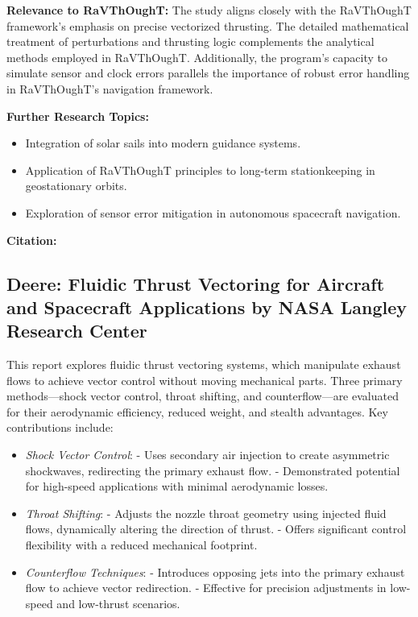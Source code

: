 \textbf{Relevance to RaVThOughT:} The study aligns closely with the RaVThOughT framework's emphasis on precise vectorized thrusting. The detailed mathematical treatment of perturbations and thrusting logic complements the analytical methods employed in RaVThOughT. Additionally, the program’s capacity to simulate sensor and clock errors parallels the importance of robust error handling in RaVThOughT's navigation framework.

\textbf{Further Research Topics:}
\begin{itemize}
    \item Integration of solar sails into modern guidance systems.
    \item Application of RaVThOughT principles to long-term stationkeeping in geostationary orbits.
    \item Exploration of sensor error mitigation in autonomous spacecraft navigation.
\end{itemize}

\textbf{Citation:} 

\subsection{Deere: Fluidic Thrust Vectoring for Aircraft and Spacecraft Applications by NASA Langley Research Center}

This report explores fluidic thrust vectoring systems, which manipulate exhaust flows to achieve vector control without moving mechanical parts. Three primary methods—shock vector control, throat shifting, and counterflow—are evaluated for their aerodynamic efficiency, reduced weight, and stealth advantages. Key contributions include:

\begin{itemize}
  \item \textit{Shock Vector Control}:
  - Uses secondary air injection to create asymmetric shockwaves, redirecting the primary exhaust flow.
  - Demonstrated potential for high-speed applications with minimal aerodynamic losses.

  \item \textit{Throat Shifting}:
  - Adjusts the nozzle throat geometry using injected fluid flows, dynamically altering the direction of thrust.
  - Offers significant control flexibility with a reduced mechanical footprint.

  \item \textit{Counterflow Techniques}:
  - Introduces opposing jets into the primary exhaust flow to achieve vector redirection.
  - Effective for precision adjustments in low-speed and low-thrust scenarios.
\end{itemize}


